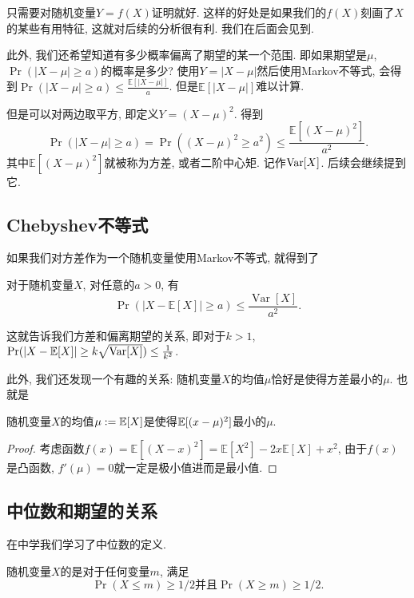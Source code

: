 \documentclass{ctexart}
\begin{document}
只需要对随机变量$Y=f(X)$证明就好. 这样的好处是如果我们的$f(X)$刻画了$X$的某些有用特征, 这就对后续的分析很有利. 我们在后面会见到. 

此外, 我们还希望知道有多少概率偏离了期望的某一个范围. 即如果期望是$\mu$, $\operatorname{Pr}(|X-\mu| \geq a)$的概率是多少? 使用$Y=|X-\mu|$然后使用Markov不等式, 会得到$\operatorname{Pr}(|X-\mu| \geq a) \leq \frac{\mathbb{E}[|X-\mu|]}{a}$. 但是$\mathbb{E}[|X-\mu|]$难以计算. 

但是可以对两边取平方, 即定义$Y=(X-\mu)^2$. 得到
$$\operatorname{Pr}(|X-\mu| \geq a)=\operatorname{Pr}\left((X-\mu)^2 \geq a^2\right) \leq \frac{\mathbb{E}\left[(X-\mu)^2\right]}{a^2}.$$
其中$\mathbb{E}\left[(X-\mu)^2\right]$就被称为方差, 或者二阶中心矩. 记作$\operatorname{Var}[X]$. 后续会继续提到它. 

\subsection{Chebyshev不等式} 如果我们对方差作为一个随机变量使用Markov不等式, 就得到了
\begin{theorem}
    对于随机变量$X$, 对任意的$a>0$, 有
    $$\operatorname{Pr}(|X-\mathbb{E}[X]| \geq a) \leq \frac{\operatorname{Var}[X]}{a^2}.$$
\end{theorem}

这就告诉我们方差和偏离期望的关系, 即对于$k>1$, $\operatorname{Pr}(|X-\mathbb{E}[X]| \geq k \sqrt{\operatorname{Var}[X]}) \leq \frac{1}{k^2}$. 

此外, 我们还发现一个有趣的关系: 随机变量$X$的均值$\mu$恰好是使得方差最小的$\mu$. 也就是

\begin{prop}
    随机变量$X$的均值$\mu:=\mathbb E[X]$是使得$\mathbb E[(x-\mu)^2]$最小的$\mu$. 
\end{prop}

\begin{proof}
    考虑函数$f(x)=\mathbb{E}\left[(X-x)^2\right]=\mathbb{E}\left[X^2\right]-2 x \mathbb{E}[X]+x^2$, 由于$f(x)$是凸函数, $f'(\mu)=0$就一定是极小值进而是最小值. 
\end{proof}

\subsection{中位数和期望的关系} 在中学我们学习了中位数的定义. 
\begin{definition}[中位数]
    随机变量$X$的是对于任何变量$m$, 满足$$\operatorname{Pr}(X \leq m) \geq 1 / 2 \text{并且} \operatorname{Pr}(X \geq m) \geq 1 / 2.$$
\end{definition}
\end{document}
